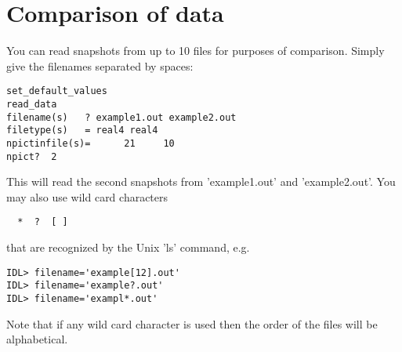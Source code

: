 \documentclass{article}
\begin{document}
\section{Comparison of data \label{s-compare}}

   You can read snapshots from up to 10 files for purposes of
   comparison. Simply give the filenames separated by spaces:
\begin{verbatim}
set_default_values
read_data
filename(s)   ? example1.out example2.out
filetype(s)   = real4 real4
npictinfile(s)=      21     10
npict?  2
\end{verbatim}
   This will read the second snapshots from 'example1.out' and
   'example2.out'. You may also use wild card characters 
\begin{verbatim}
  *  ?  [ ]
\end{verbatim}
    that are recognized by the Unix 'ls' command, e.g.
\begin{verbatim}
IDL> filename='example[12].out'
IDL> filename='example?.out'
IDL> filename='exampl*.out'
\end{verbatim}
   Note that if any wild card character is used then the order of the files will 
   be alphabetical.
\end{document}
